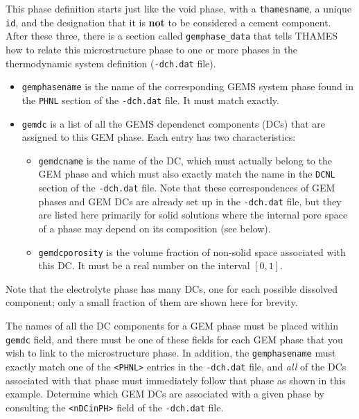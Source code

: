 \documentclass{article}
\begin{document}
{\normalsize{ }
This phase definition starts just like the void phase, with a
\verb!thamesname!, a unique \verb!id!, and the designation
that it is \textbf{not} to be considered a cement component.
After these three, there is a section called \verb!gemphase_data!
that tells THAMES how
to relate this microstructure phase to one or more phases in
the thermodynamic system definition (\verb!-dch.dat! file).
\begin{itemize}
	\item \verb!gemphasename! is the name of the corresponding
	      GEMS system phase found in the \verb!PHNL! section of the
	      \verb!-dch.dat! file. It must match exactly.
	\item \verb!gemdc! is a list of all the GEMS dependenct
	      components (DCs) that are assigned to this GEM phase.
	      Each entry has two characteristics:
	      \begin{itemize}
		      \item \verb!gemdcname! is the name of the DC, which must
		            actually belong to the GEM phase and which must also
		            exactly match the name in the \verb!DCNL! section of
		            the \verb!-dch.dat! file. Note that these correspondences
		            of GEM phases and GEM DCs are already set up in the
		            \verb!-dch.dat! file, but they are listed here primarily
		            for solid solutions where the internal pore space of
		            a phase may depend on its composition (see below).
		      \item \verb!gemdcporosity! is the volume fraction of
		            non-solid space associated with this DC. It must be a
		            real number on the interval $\left[0,1\right]$.
	      \end{itemize}
\end{itemize}
Note that the electrolyte phase has many DCs, one for each
possible dissolved component; only a small fraction of them are
shown here for brevity.

The names of all
the DC components for a GEM phase must be placed within \verb!gemdc! field,
and there must be one of these fields for each GEM phase that you wish to link
to the microstructure phase.  In addition, the \verb!gemphasename! must exactly match
one of the \verb!<PHNL>! entries in the \verb!-dch.dat! file, and
\textit{all} of the DCs associated with that phase must immediately follow that
phase as shown in this example.  Determine which GEM DCs are associated
with a given phase by consulting the \verb!<nDCinPH>! field of the \verb!-dch.dat! file.

}
\end{document}
